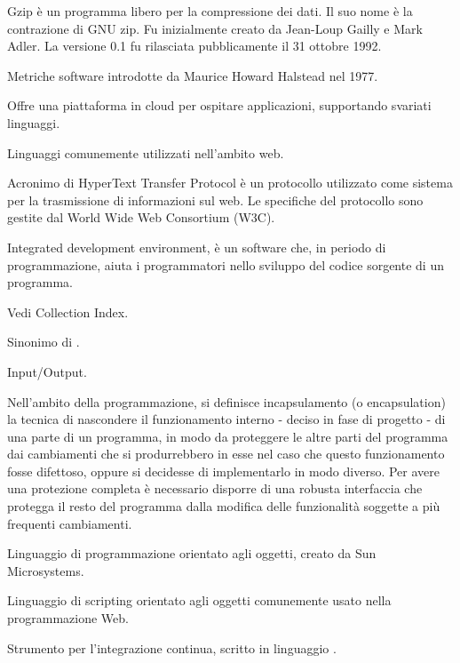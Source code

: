 Gzip è un programma libero per la compressione dei dati. Il suo nome è la contrazione di GNU zip. Fu inizialmente creato da Jean-Loup Gailly e Mark Adler. La versione 0.1 fu rilasciata pubblicamente il 31 ottobre 1992.


Metriche software introdotte da Maurice Howard Halstead nel 1977.

Offre una piattaforma in cloud per ospitare applicazioni, supportando svariati linguaggi.

Linguaggi comunemente utilizzati nell'ambito web.

Acronimo di HyperText Transfer Protocol è un protocollo utilizzato come sistema per la trasmissione di informazioni sul web.
Le specifiche del protocollo sono gestite dal World Wide Web Consortium (W3C).


Integrated development environment,  è un software che, in periodo di programmazione, aiuta i programmatori nello sviluppo del codice sorgente di un programma.

Vedi Collection Index.

Sinonimo di .

Input/Output.

Nell'ambito della programmazione, si definisce incapsulamento (o encapsulation) la tecnica di nascondere il funzionamento interno - deciso in fase di progetto - di una parte di un programma, in modo da proteggere le altre parti del programma dai cambiamenti che si produrrebbero in esse nel caso che questo funzionamento fosse difettoso, oppure si decidesse di implementarlo in modo diverso. Per avere una protezione completa è necessario disporre di una robusta interfaccia che protegga il resto del programma dalla modifica delle funzionalità soggette a più frequenti cambiamenti.


Linguaggio di programmazione orientato agli oggetti, creato da Sun Microsystems.

Linguaggio di scripting orientato agli oggetti comunemente usato nella programmazione Web.

Strumento  per l'integrazione continua, scritto in linguaggio . 

